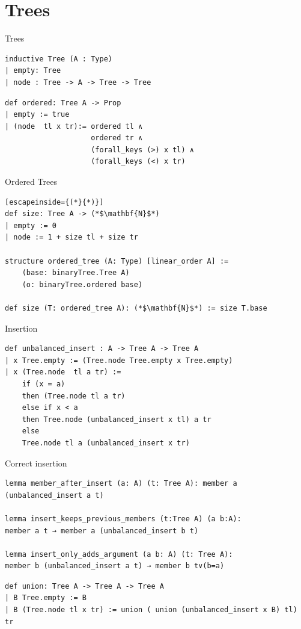 \documentclass{beamer}
\begin{document}
    \section{Trees}
    \begin{frame}[fragile]{Trees}
        \begin{lstlisting}
inductive Tree (A : Type)
| empty: Tree 
| node : Tree -> A -> Tree -> Tree
        \end{lstlisting}

    \begin{lstlisting}
def ordered: Tree A -> Prop
| empty := true
| (node  tl x tr):= ordered tl ∧ 
                    ordered tr ∧ 
                    (forall_keys (>) x tl) ∧ 
                    (forall_keys (<) x tr)

    \end{lstlisting}
    \end{frame}
    \begin{frame}[fragile]{Ordered Trees}
        \begin{lstlisting}[escapeinside={(*}{*)}]
def size: Tree A -> (*$\mathbf{N}$*)
| empty := 0
| node := 1 + size tl + size tr

structure ordered_tree (A: Type) [linear_order A] := 
    (base: binaryTree.Tree A) 
    (o: binaryTree.ordered base)

def size (T: ordered_tree A): (*$\mathbf{N}$*) := size T.base
        \end{lstlisting}

    
    \end{frame}
    \begin{frame}[fragile]{Insertion}
        \begin{lstlisting}[aboveskip=0pt, belowskip=0pt]
def unbalanced_insert : A -> Tree A -> Tree A
| x Tree.empty := (Tree.node Tree.empty x Tree.empty)
| x (Tree.node  tl a tr) := 
    if (x = a)
    then (Tree.node tl a tr)
    else if x < a 
    then Tree.node (unbalanced_insert x tl) a tr
    else
    Tree.node tl a (unbalanced_insert x tr)
        \end{lstlisting}
    \end{frame}
    \begin{frame}[fragile]{Correct insertion}
        \begin{lstlisting}[aboveskip=0pt, belowskip=0pt]
lemma member_after_insert (a: A) (t: Tree A): member a (unbalanced_insert a t)

lemma insert_keeps_previous_members (t:Tree A) (a b:A): 
member a t → member a (unbalanced_insert b t)

lemma insert_only_adds_argument (a b: A) (t: Tree A): 
member b (unbalanced_insert a t) → member b t∨(b=a)
        \end{lstlisting}
    \pause
    \begin{lstlisting}[aboveskip=0pt, belowskip=0pt]
def union: Tree A -> Tree A -> Tree A
| B Tree.empty := B
| B (Tree.node tl x tr) := union ( union (unbalanced_insert x B) tl) tr

    \end{lstlisting}

    \end{frame}
\end{document}
